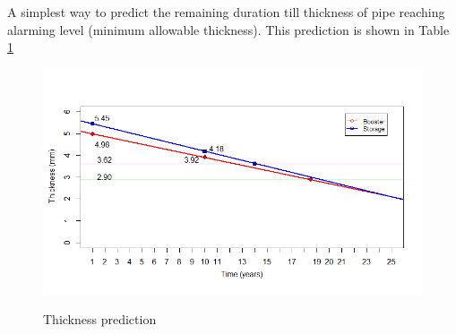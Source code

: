 


A simplest way to predict the remaining duration till thickness of pipe reaching alarming level (minimum allowable thickness). This prediction is shown in Table \ref{ch04_thickness_predict}


\begin{figure}[!htb]
	\includegraphics[scale=0.6]{figures/ch04_thickness_predict} \\
	\caption{Thickness prediction}
	\label{ch04_thickness_predict} 
\end{figure}

